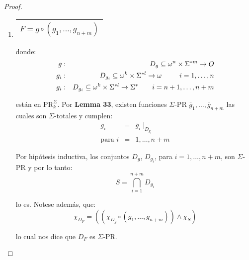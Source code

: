 \begin{proof}
\begin{enumerate}
      \item \begin{tabular}{|c|} \hline $F = g \circ (g_{1}, \dotsc, g_{n+m})$ \\\hline \end{tabular} donde:
        \begin{eqnarray*}
          g &:& D_{g} \subseteq \omega^{n} \times \Sigma^{\ast m} \rightarrow O \\
          g_{i} &:& D_{g_{i}} \subseteq \omega^{k} \times \Sigma^{\ast l} \rightarrow \omega \qquad \;\; i = 1, \dotsc,
            n \\
          g_{i} &:& D_{g_{i}} \subseteq \omega^{k} \times \Sigma^{\ast l} \rightarrow \Sigma^{\ast} \qquad i = n + 1, \dotsc,
            n + m
        \end{eqnarray*}

        \PN están en $\mathrm{PR}_{k}^{\Sigma}$. Por \textbf{Lemma 33}, existen funciones $\Sigma$-PR $\bar{g}_{1},
        \dotsc, \bar{g}_{n+m}$ las cuales son $\Sigma$-totales y cumplen:
        \begin{eqnarray*}
          g_{i} &=& \bar{g}_{i} \mid_{D_{g_{i}}} \\
          \text{para } i &=& 1, \dotsc, n + m
        \end{eqnarray*}

        \PN Por hipótesis inductiva, los conjuntos $D_{g}$, $D_{g_{i}}$, para $i = 1, \dotsc, n + m$, son $\Sigma$-PR y
        por lo tanto:
        \[
          S = \bigcap_{i=1}^{n+m} D_{g_{i}}
        \]

        \PN lo es. Notese además, que:
        \[
          \chi_{D_{F}} = \left((\chi_{D_{g}} \circ (\bar{g}_{1}, \dotsc, \bar{g}_{n+m})) \wedge \chi_{S}\right)
        \]

        \PN lo cual nos dice que $D_{F}$ es $\Sigma$-PR.
    \end{enumerate}
  \end{proof}
